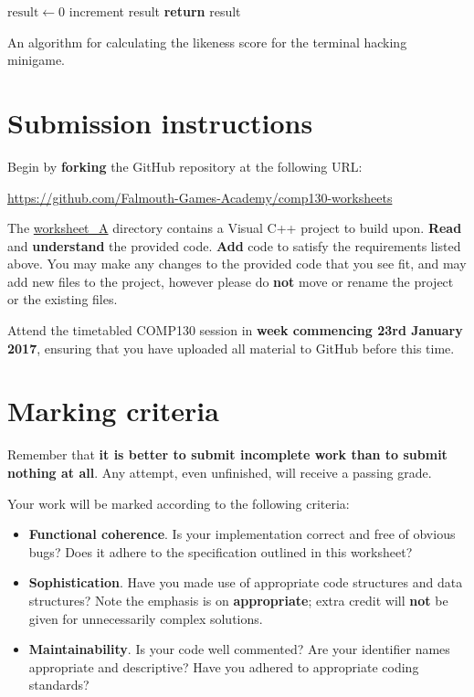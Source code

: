 \documentclass{../../fal_assignment}
\begin{document}
\begin{algorithm}[h]
\begin{algorithmic}
        \State $\text{result} \gets 0$
                \State increment result
            \EndIf
        \EndFor
        \State \textbf{return} result
    \EndProcedure
\end{algorithmic}
\caption{An algorithm for calculating the likeness score for the terminal hacking minigame.}
\label{alg:a_likeness}
\end{algorithm}

\section*{Submission instructions}

Begin by \textbf{forking} the GitHub repository at the following URL:

\url{https://github.com/Falmouth-Games-Academy/comp130-worksheets}

The \url{worksheet_A} directory contains a Visual C++ project to build upon.
\textbf{Read} and \textbf{understand} the provided code.
\textbf{Add} code to satisfy the requirements listed above.
You may make any changes to the provided code that you see fit,
and may add new files to the project,
however please do \textbf{not} move or rename the project or the existing files.

Attend the timetabled COMP130 session in \textbf{week commencing 23rd January 2017},
ensuring that you have uploaded all material to GitHub before this time.

\section*{Marking criteria}

Remember that \textbf{it is better to submit incomplete work than to submit nothing at all}.
Any attempt, even unfinished, will receive a passing grade.

Your work will be marked according to the following criteria:
\begin{itemize}
	\item \textbf{Functional coherence}. Is your implementation correct and free of obvious bugs?
		Does it adhere to the specification outlined in this worksheet?
	\item \textbf{Sophistication}. Have you made use of appropriate code structures and data structures?
		Note the emphasis is on \textbf{appropriate}; extra credit will \textbf{not} be given for unnecessarily complex solutions.
	\item \textbf{Maintainability}. Is your code well commented? Are your identifier names appropriate and descriptive?
		Have you adhered to appropriate coding standards?
\end{itemize}
\end{document}
